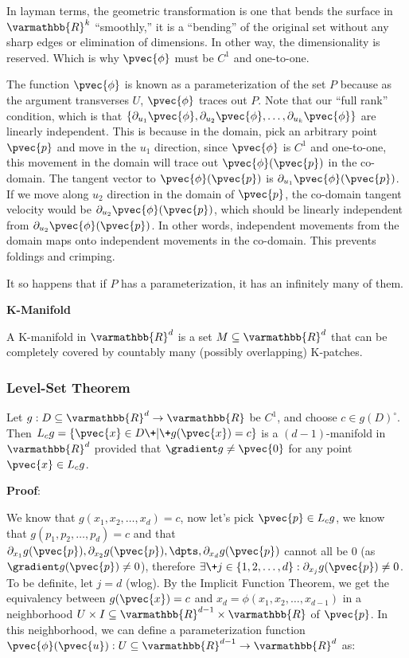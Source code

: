 \documentclass[11 pt, twoside]{article}
\begin{document}
In layman terms, the geometric transformation is one that bends the surface in
$\varmathbb{R}^k$ ``smoothly,'' it is a ``bending'' of the original set without
any sharp edges or elimination of dimensions. In other way, the dimensionality
is reserved. Which is why $\pvec{\phi}$ must be $C^1$ and one-to-one.

The function $\pvec{\phi}$ is known as a parameterization of the set $P$ because
as the argument transverses $U$, $\pvec{\phi}$ traces out $P$. Note that our
``full rank'' condition, which is that $\{\partial_{u_1} \pvec{\phi},
\partial_{u_2} \pvec{\phi}, \dots, \partial_{u_k} \pvec{\phi}\}$ are linearly
independent. This is because in the domain, pick an arbitrary point $\pvec{p}$
and move in the $u_1$ direction, since $\pvec{\phi}$ is $C^1$ and one-to-one,
this movement in the domain will trace out $\pvec{\phi}(\pvec{p})$ in the
co-domain. The tangent vector to $\pvec{\phi}(\pvec{p})$ is $\partial_{u_1}
\pvec{\phi}(\pvec{p})$. If we move along $u_2$ direction in the domain of
$\pvec{p}$, the co-domain tangent velocity would be
$\partial_{u_2}\pvec{\phi}(\pvec{p})$, which should be linearly independent from
$\partial_{u_2}\pvec{\phi}(\pvec{p})$. In other words, independent movements from
the domain maps onto independent movements in the co-domain. This prevents
foldings and crimping.

It so happens that if $P$ has a parameterization, it has an infinitely many of
them.

\textbf{K-Manifold}

A K-manifold in $\varmathbb{R}^d$ is a set $M \subseteq \varmathbb{R}^d$ that
can be completely covered by countably many (possibly overlapping) K-patches.

\subsubsection{Level-Set Theorem}

Let $g: D \subseteq \varmathbb{R}^d \to \varmathbb{R}$ be $C^1$, and choose $c
\in g(D)^\circ$. Then $L_c g = \{\pvec{x} \in D \+|\+ g(\pvec{x}) = c\}$ is a $(d
- 1)$-manifold in $\varmathbb{R}^d$ provided that $\gradient g \neq \pvec{0}$ for any
point $\pvec{x} \in L_c g$.

\textbf{Proof}:

We know that $g(x_1, x_2, \dots, x_d) = c$, now let's pick $\pvec{p} \in L_c g$,
we know that $g(p_1, p_2, \dots, p_d) = c$ and that $\partial_{x_1} g(\pvec{p}),
\partial_{x_2} g(\pvec{p}), \dpts, \partial_{x_d} g(\pvec{p})$ cannot all be 0 (as
$\gradient g(\pvec{p}) \neq 0$), therefore $\exists\+ j \in \{1,2,\dots,d\} :
\partial_{x_j} g(\pvec{p}) \neq 0$. To be definite, let $j = d$ (wlog). By the
Implicit Function Theorem, we get the equivalency between $g(\pvec{x}) = c$ and
$x_d = \phi(x_1, x_2, \dots, x_{d - 1})$ in a neighborhood $U \times I \subseteq
\varmathbb{R}^{d - 1} \times \varmathbb{R}$ of $\pvec{p}$. In this neighborhood,
we can define a parameterization function $\pvec{\phi} (\pvec{u}) :
U \subseteq \varmathbb{R}^{d - 1} \to \varmathbb{R}^d$ as: 
\end{document}
